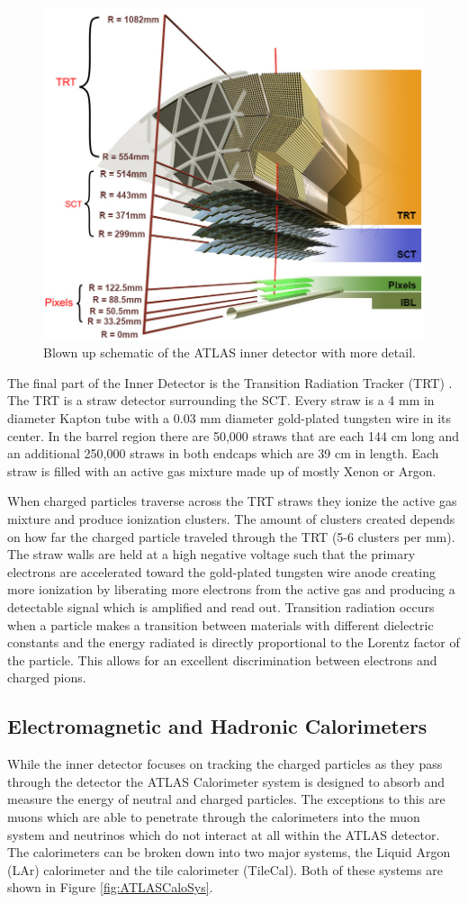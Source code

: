 \begin{figure}[ht!]
	\centering
	\includegraphics[width=0.5\columnwidth]{../ThesisImages/LHCImages/ATLASInnerStructure.png}
	\caption[Blown up schematic of the ATLAS inner detector with more detail.]{Blown up schematic of the ATLAS inner detector with more detail\cite{Potamianos:2016ptf}.
	}
	\label{fig:ATLASInnerDet}
\end{figure}

The final part of the Inner Detector is the Transition Radiation Tracker (TRT) \cite{Mindur:2017nqn}.  The TRT is a straw detector surrounding the SCT.  Every straw is a 4 mm in diameter Kapton tube with a 0.03 mm diameter gold-plated tungsten wire in its center.  In the barrel region there are 50,000 straws that are each 144 cm long and an additional 250,000 straws in both endcaps which are 39 cm in length.  Each straw is filled with an active gas mixture made up of mostly Xenon or Argon. 

When charged particles traverse across the TRT straws they ionize the active gas mixture and produce ionization clusters.  The amount of clusters created depends on how far the charged particle traveled through the TRT (5-6 clusters per mm).  The straw walls are held at a high negative voltage such that the primary electrons are accelerated toward the gold-plated tungsten wire anode creating more ionization by liberating more electrons from the active gas and producing a detectable signal which is amplified and read out.  Transition radiation occurs when a particle makes a transition between materials with different dielectric constants and the energy radiated is directly proportional to the Lorentz factor of the particle.  This allows for an excellent discrimination between electrons and charged pions.



\subsection{Electromagnetic and Hadronic Calorimeters}
\label{sec:EMHCal}
While the inner detector focuses on tracking the charged particles as they pass through the detector the ATLAS Calorimeter system is designed to absorb and measure the energy of neutral and charged particles.  The exceptions to this are muons which are able to penetrate through the calorimeters into the muon system and neutrinos which do not interact at all within the ATLAS detector.  The calorimeters can be broken down into two major systems, the Liquid Argon (LAr) calorimeter\cite{CERN-LHCC-96-041} and the tile calorimeter (TileCal)\cite{CERN-LHCC-96-042}.  Both of these systems are shown in Figure \ref{fig:ATLASCaloSys}.

